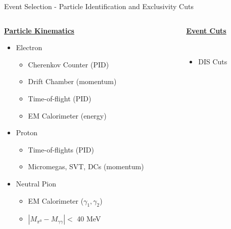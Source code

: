 \documentclass[aspectratio=169]{beamer}
\begin{document}
\begin{frame}{Event Selection - Particle Identification and Exclusivity Cuts}
        
        \begin{columns}[c]
           \begin{column}{0.35\textwidth}
            \centering \textbf{\underline{Particle Kinematics}}
                \begin{itemize}
                    \item Electron
                        \begin{itemize}
                            \item Cherenkov Counter (PID)
                            \item Drift Chamber (momentum)
                            \item Time-of-flight (PID)
                            \item EM Calorimeter (energy)
                        \end{itemize}
                    \item Proton
                        \begin{itemize}
                            \item Time-of-flights (PID)
                            \item Micromegas, SVT, DCs (momentum)
                        \end{itemize}
                    \item Neutral Pion
                        \begin{itemize}
                            \item EM Calorimeter ($\gamma_1, \gamma_2$)
                            \item $ |M_{\pi^0} - M_{\gamma\gamma}| <$ 40 MeV
                        \end{itemize}
                \end{itemize}
                \end{column}
            \vrule{}
            \begin{column}{0.65\textwidth}
            
            \centering  \textbf{\underline{Event Cuts}}
                    \begin{columns}[t, onlytextwidth]
                
                \begin{itemize}
                 \setlength\itemsep{0.5em}
                \item DIS Cuts
                   

\end{itemize}
\end{columns}
\end{column}
\end{columns}
\end{frame}
\end{document}
